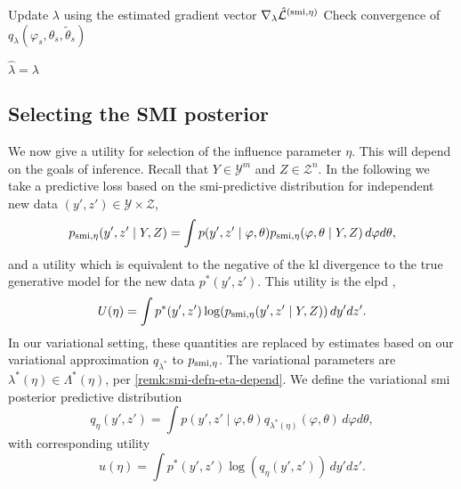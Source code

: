 \begin{algorithm}[tb]
\begin{algorithmic}
    \STATE Update $\lambda$ using the estimated gradient vector $\nabla_{\lambda}\hat{\mathcal{L}}^{( \operatorname{\text{smi}}, \eta)}$
    \STATE Check convergence of $q_{\lambda}(\varphi_s, \theta_s, \tilde\theta_s)$
    \ENDWHILE

    \RETURN $\hat\lambda=\lambda$

  \end{algorithmic}
\end{algorithm}


\subsection{Selecting the SMI posterior} \label{subsec:best_smi}

We now give a utility for selection of the influence parameter $\eta$.
This will depend on the goals of inference. Recall that $Y\in \mathcal{Y}^m$ and $Z\in \mathcal{Z}^n$.
In the following we take a predictive loss based on the \acrshort*{smi}-predictive distribution for independent new data $(y',z')\in \mathcal{Y}\times\mathcal{Z}$,
\begin{equation*}
  p_{\operatorname{\text{smi}},\eta}(y',z' \mid Y,Z)=\int p(y',z' \mid \varphi,\theta)p_{\operatorname{\text{smi}},\eta}(\varphi,\theta \mid Y,Z)\,d\varphi d\theta,
\end{equation*}
and a utility which is equivalent to the negative of the \acrshort*{kl} divergence to the true generative model for the new data $p^*(y',z')$.
This utility is the \acrfull*{elpd} \citep{Vehtari2016},
\begin{equation*}
  U(\eta)=\int p^*(y',z')\log(p_{\operatorname{\text{smi}},\eta}(y',z' \mid Y,Z))\,dy' dz'.
\end{equation*}
In our variational setting, these quantities are replaced by estimates based on our variational approximation $q_{\lambda^*}$ to $p_{\operatorname{\text{smi}},\eta}$.
The variational parameters are $\lambda^*(\eta)\in \Lambda^*(\eta)$, per \cref{remk:smi-defn-eta-depend}.
We define the variational \acrshort*{smi} posterior predictive distribution
\begin{equation}\label{eq:post_predictive_var_smi}
  q_{\eta}(y',z')=\int p(y',z' \mid \varphi,\theta)q_{\lambda^*(\eta)}(\varphi,\theta)\,d\varphi d\theta,
\end{equation}
with corresponding utility
\begin{equation}\label{eq:ELPD_var_smi_def}
  u(\eta)=\int p^*(y',z')\log(q_{\eta}(y',z'))\,dy' dz'.
\end{equation}
